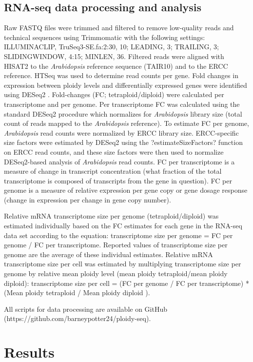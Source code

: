 \documentclass[11pt]{article}
\begin{document}
\subsection*{RNA-seq data processing and analysis}
Raw FASTQ files were trimmed and filtered to remove low-quality reads and technical sequences using Trimmomatic \citep{bolger2014} with the following settings: ILLUMINACLIP, TruSeq3-SE.fa:2:30, 10; LEADING, 3; TRAILING, 3; SLIDINGWINDOW, 4:15; MINLEN, 36. Filtered reads were aligned with HISAT2 \citep{pertea2016} to the {\it Arabidopsis} reference sequence (TAIR10) and to the ERCC reference. HTSeq \citep{anders2015} was used to determine read counts per gene. Fold changes in expression between ploidy levels and differentially expressed genes were identified using DESeq2 \citep{love2014}. Fold-changes (FC; tetraploid/diploid) were calculated per transcriptome and per genome. Per transcriptome FC was calculated using the standard DESeq2 procedure which normalizes for {\it Arabidopsis} library size (total count of reads mapped to the {\it Arabidopsis} reference). To estimate FC per genome, {\it Arabidopsis} read counts were normalized by ERCC library size. ERCC-specific size factors were estimated by DESeq2 using the ?estimateSizeFactors? function on ERCC read counts, and these size factors were then used to normalize DESeq2-based analysis of {\it Arabidopsis} read counts. FC per transcriptome is a measure of change in transcript concentration (what fraction of the total transcriptome is composed of transcripts from the gene in question). FC per genome is a measure of relative expression per gene copy or gene dosage response (change in expression per change in gene copy number).

Relative mRNA transcriptome size per genome (tetraploid/diploid) was estimated individually based on the FC estimates for each gene in the RNA-seq data set according to the equation: transcriptome size per genome = FC per genome / FC per transcriptome. Reported values of transcriptome size per genome are the average of these individual estimates. Relative mRNA transcriptome size per cell was estimated by multiplying transcriptome size per genome by relative mean ploidy level (mean ploidy tetraploid/mean ploidy diploid): transcriptome size per cell = (FC per genome / FC per transcriptome) * (Mean ploidy tetraploid / Mean ploidy diploid ). 

All scripts for data processing are available on GitHub (https://github.com/barneypotter24/ploidy-seq).

\section*{Results}
\end{document}
